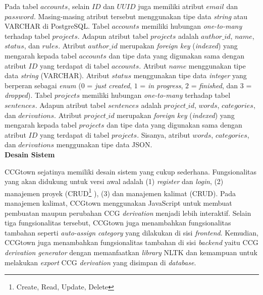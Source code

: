 Pada tabel $accounts$, selain $ID$ dan $UUID$ juga memiliki atribut $email$ dan
$password$. Masing-masing atribut tersebut menggunakan tipe data \textit{string}
atau VARCHAR di PostgreSQL.
Tabel $accounts$ memiliki hubungan \textit{one-to-many} terhadap tabel $projects$.
Adapun atribut tabel $projects$ adalah $author\_id$, $name$, $status$, dan $rules$.
Atribut $author\_id$ merupakan \textit{foreign key} (\textit{indexed}) yang
mengarah kepada tabel $accounts$ dan tipe data yang digunakan sama dengan
atribut $ID$ yang terdapat di tabel $accounts$.
Atribut $name$ menggunakan tipe data \textit{string} (VARCHAR).
Atribut $status$ menggunakan tipe data \textit{integer} yang berperan sebagai
\textit{enum} ($0$ = \textit{just created}, $1$ = \textit{in progress},
$2$ = \textit{finished}, dan $3$ = \textit{dropped}).
Tabel $projects$ memiliki hubungan \textit{one-to-many} terhadap tabel $sentences$.
Adapun atribut tabel $sentences$ adalah $project\_id$, $words$, $categories$, dan
$derivations$. Atribut $project\_id$ merupakan \textit{foreign key}
(\textit{indexed}) yang mengarah kepada tabel $projects$ dan tipe data yang digunakan
sama dengan atribut $ID$ yang terdapat di tabel $projects$.
Sisanya, atribut $words$, $categories$, dan $derivations$ menggunakan tipe data JSON.
\\


\noindent\textbf{Desain Sistem}

CCGtown sejatinya memiliki desain sistem yang cukup sederhana.
Fungsionalitas yang akan didukung untuk versi awal adalah (1) \textit{register} dan
\textit{login}, (2) manajemen proyek (CRUD\footnote{Create, Read, Update, Delete}
), (3) dan manajemen kalimat (CRUD).
Pada manajemen kalimat, CCGtown menggunakan JavaScript untuk membuat pembuatan
maupun perubahan CCG \textit{derivation} menjadi lebih interaktif.
Selain tiga fungsionalitas tersebut, CCGtown juga menambahkan fungsionalitas tambahan
seperti \textit{auto-assign category} yang dilakukan di sisi \textit{frontend}.
Kemudian, CCGtown juga menambahkan fungsionalitas tambahan di sisi \textit{backend}
yaitu CCG \textit{derivation generator} dengan memanfaatkan \textit{library} NLTK
dan kemampuan untuk melakukan \textit{export} CCG \textit{derivation} yang disimpan
di \textit{database}.

